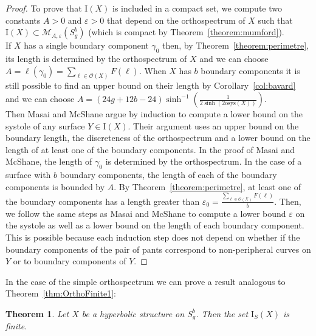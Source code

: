 \documentclass[a4paper,12pt]{article}
\newtheorem{theorem}{Theorem}[section]
\theoremstyle{definition}
\theoremstyle{remark}
\begin{document}
\begin{proof}
   
    To prove that $\mathrm{I}(X)$ is included in a compact set, we compute two constants $A>0$ and $\varepsilon>0$ that depend on the orthospectrum of $X$ such that $\mathrm{I}(X)\subset \mathcal{M}_{A, \varepsilon}(S_g^b)$ (which is compact by Theorem~\ref{theorem:mumford}).\\
   
    If $X$ has a single boundary component $\gamma_0$ then, by Theorem~\ref{theorem:perimetre}, its length is determined by the orthospectrum of $X$ and we can choose $A=\ell(\gamma_0)=\sum_{\ell \in \mathcal{O}(X)} F(\ell)$.
    When $X$ has $b$ boundary components it is still possible to find an upper bound on their length by Corollary~\ref{col:bavard} and we can choose $A=(24g+12b-24) \sinh^{-1}\left( \frac{1}{2\sinh(2 \mathrm{osys}(X))} \right)$.\\
   
    Then Masai and McShane argue by induction to compute a lower bound on the systole of any surface $Y \in \mathrm{I}(X)$. Their argument uses an upper bound on the boundary length, the discreteness of the orthospectrum and a lower bound on the length of at least one of the boundary components. In the proof of Masai and McShane, the length of $\gamma_0$ is determined by the orthospectrum. In the case of a surface with $b$ boundary components, the length of each of the boundary components is bounded by $A$. By Theorem~\ref{theorem:perimetre}, at least one of the boundary components has a length greater than $\varepsilon_0 = \frac{\sum_{\ell \in \mathcal{O}(X)} F(\ell)}{b}$. Then, we follow the same steps as Masai and McShane to compute a lower bound $\varepsilon$ on the systole as well as a lower bound on the length of each boundary component. This is possible because each induction step does not depend on whether if the boundary components of the pair of pants correspond to non-peripheral curves on $Y$ or to boundary components of $Y$.
\end{proof}





In the case of the simple orthospectrum we can prove a result analogous to Theorem~\ref{thm:OrthoFinite1}:

\begin{theorem}\label{thm:OrthoFiniteSimple}
    Let $X$ be a hyperbolic structure on $S_g^b$. Then the set $\mathrm{I}_S(X)$ is finite.
\end{theorem}
\end{document}
